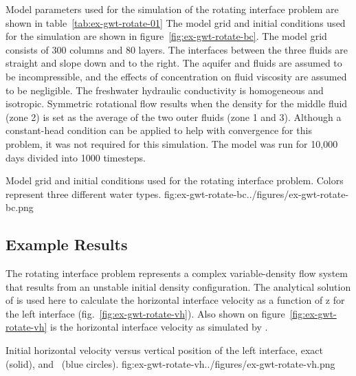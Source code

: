 Model parameters used for the \mf simulation of the rotating interface problem are shown in table~\ref{tab:ex-gwt-rotate-01} The model grid and initial conditions used for the \mf simulation are shown in figure~\ref{fig:ex-gwt-rotate-bc}. The model grid consists of 300 columns and 80 layers.  The interfaces between the three fluids are straight and slope down and to the right. The aquifer and fluids are assumed to be incompressible, and the effects of concentration on fluid viscosity are assumed to be negligible. The freshwater hydraulic conductivity is homogeneous and isotropic. Symmetric rotational flow results when the density for the middle fluid (zone 2) is set as the average of the two outer fluids (zone 1 and 3).   Although a constant-head condition can be applied to help with convergence for this problem, it was not required for this \mf simulation.  The \mf model was run for 10,000 days  divided into 1000 timesteps. 



\begin{StandardFigure}{
                                     Model grid and initial conditions used for the rotating interface problem.  Colors represent three different water types.
                                     }{fig:ex-gwt-rotate-bc}{../figures/ex-gwt-rotate-bc.png}
\end{StandardFigure}                                 


\subsection{Example Results}

The rotating interface problem represents a complex variable-density flow system that results from an unstable initial density configuration.  The analytical solution of \cite{bakker2004} is used here to calculate the horizontal interface velocity as a function of z for the left interface (fig.~\ref{fig:ex-gwt-rotate-vh}).  Also shown on figure~\ref{fig:ex-gwt-rotate-vh} is the horizontal interface velocity as simulated by \mf.  

\begin{StandardFigure}{
                                     Initial horizontal velocity versus vertical position of the left interface, exact (solid), and \mf~(blue circles).
                                     }{fig:ex-gwt-rotate-vh}{../figures/ex-gwt-rotate-vh.png}
\end{StandardFigure}                                 

